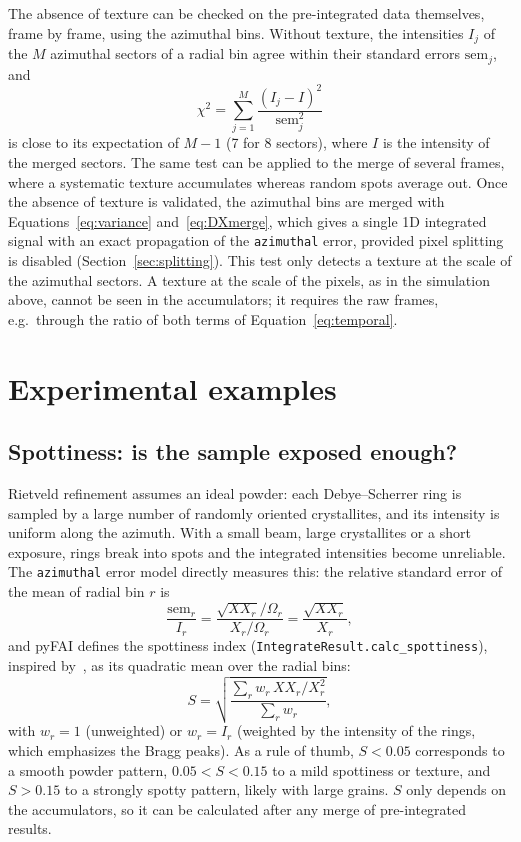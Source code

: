 \documentclass[a4paper,11pt]{article}
\newcommand{\Om}{\Omega}
\begin{document}
The absence of texture can be checked on the pre-integrated data themselves, frame by frame, using the
azimuthal bins. Without texture, the intensities $I_j$ of the $M$ azimuthal sectors of a radial bin agree
within their standard errors $\mathrm{sem}_j$, and
\begin{equation}
  \chi^2 = \sum_{j=1}^{M}\frac{\left(I_j - I\right)^2}{\mathrm{sem}_j^2}
  \label{eq:chi2}
\end{equation}
is close to its expectation of $M-1$ (7 for 8 sectors), where $I$ is the intensity of the merged sectors. The same test can
be applied to the merge of several frames, where a systematic texture accumulates whereas random
spots average out. Once the absence of texture is validated, the azimuthal bins are merged with
Equations~\eqref{eq:variance} and~\eqref{eq:DXmerge}, which gives a single 1D integrated signal with an
exact propagation of the \texttt{azimuthal} error, provided pixel splitting is disabled
(Section~\ref{sec:splitting}). This test only detects a texture at the scale of the
azimuthal sectors. A texture at the scale of the pixels, as in the simulation above, cannot be seen in
the accumulators; it requires the raw frames, e.g.\ through the ratio of both terms of
Equation~\eqref{eq:temporal}.

\section{Experimental examples}

\subsection{Spottiness: is the sample exposed enough?}
\label{sec:spottiness}

Rietveld refinement assumes an ideal powder: each Debye--Scherrer ring is sampled by a large number of
randomly oriented crystallites, and its intensity is uniform along the azimuth. With a small beam, large
crystallites or a short exposure, rings break into spots and the integrated intensities become
unreliable. The \texttt{azimuthal} error model directly measures this: the relative standard error of
the mean of radial bin $r$ is
\begin{equation}
  \frac{\mathrm{sem}_r}{I_r} = \frac{\sqrt{XX_r}/\Om_r}{X_r/\Om_r} = \frac{\sqrt{XX_r}}{X_r},
\end{equation}
and pyFAI defines the spottiness index (\texttt{IntegrateResult.calc\_spottiness}), inspired
by~\cite{Ingham14}, as its quadratic mean over the radial bins:
\begin{equation}
  S = \sqrt{\frac{\sum_r w_r\,XX_r/X_r^2}{\sum_r w_r}},
  \label{eq:spottiness}
\end{equation}
with $w_r=1$ (unweighted) or $w_r=I_r$ (weighted by the intensity of the rings, which emphasizes the
Bragg peaks). As a rule of thumb, $S<0.05$ corresponds to a smooth powder pattern, $0.05<S<0.15$ to a
mild spottiness or texture, and $S>0.15$ to a strongly spotty pattern, likely with large grains.
$S$ only depends on the accumulators, so it can be calculated after any merge of pre-integrated results.
\end{document}
